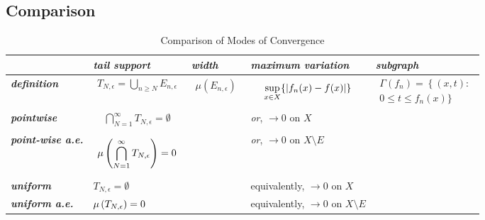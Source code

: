 \documentclass[11pt]{article}
\begin{document}
\subsection{Comparison}
\begin{table}[h!]
\setlength{\abovedisplayskip}{0pt}
\setlength{\belowdisplayskip}{-10pt}
\setlength{\abovedisplayshortskip}{0pt}
\setlength{\belowdisplayshortskip}{0pt}
\footnotesize
\centering
\caption{Comparison of Modes of Convergence}
\label{tab: convergence}
\renewcommand\tabularxcolumn[1]{m{#1}}
\small
\begin{tabularx}{1\textwidth} { 
  | >{\raggedright\arraybackslash} m{2cm}
  | >{\centering\arraybackslash}X
  | >{\centering\arraybackslash}X
  | >{\centering\arraybackslash}X
  | >{\centering\arraybackslash}X  | }
 \hline
 &    \emph{\textbf{tail support}} & \emph{\textbf{width}} & \emph{\textbf{maximum variation}} & \emph{\textbf{subgraph}}\\
 \hline 
 \emph{\textbf{definition}}& 
 \begin{align*}
 T_{N,\epsilon} =\bigcup_{n \ge N}E_{n,\epsilon}
\end{align*} &  
\begin{align*}
\mu(E_{n,\epsilon})
\end{align*}
& 
\begin{align*}
\sup_{x \in X}\{\left\lvert f_n(x) - f(x) \right\rvert\}
\end{align*}
&
\begin{align*}
\Gamma(f_{n}) =\left\{(x,t): \right.\\
\left. 0\le t \le f_n(x)\}\right.
\end{align*} 
 \\
 \hline
 \emph{\textbf{pointwise}}  & 
  \begin{align*}
 \bigcap_{N=1}^{\infty}T_{N,\epsilon} = \emptyset
\end{align*}
& & \emph{or}, $\rightarrow 0$ on $X$ &   \\
\hline
 \emph{\textbf{point-wise a.e.}}   & 
  \begin{align*}
 \mu\left(\bigcap_{N=1}^{\infty}T_{N,\epsilon}\right) = 0
\end{align*}
& &  \emph{or}, $\rightarrow 0$ on $X \setminus E$ &  \\
\hline
\emph{\textbf{uniform}}  & $T_{N,\epsilon} = \emptyset$ & & 
 equivalently, $\rightarrow 0$ on $X$ & \\
\hline
\emph{\textbf{uniform a.e.}}  & $\mu\left(T_{N,\epsilon}\right) =0$ & & 
equivalently, $\rightarrow 0$ on $X \setminus E$  & \\

\end{tabularx}
\end{table}
\end{document}
